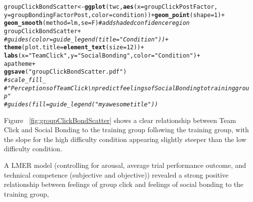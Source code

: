 \documentclass[english]{article}\usepackage[]{graphicx}\usepackage[]{color}
\makeatletter
\newcommand{\hlnum}[1]{\textcolor[rgb]{0.686,0.059,0.569}{#1}}%
\newcommand{\hlstr}[1]{\textcolor[rgb]{0.192,0.494,0.8}{#1}}%
\newcommand{\hlcom}[1]{\textcolor[rgb]{0.678,0.584,0.686}{\textit{#1}}}%
\newcommand{\hlopt}[1]{\textcolor[rgb]{0,0,0}{#1}}%
\newcommand{\hlstd}[1]{\textcolor[rgb]{0.345,0.345,0.345}{#1}}%
\newcommand{\hlkwb}[1]{\textcolor[rgb]{0.69,0.353,0.396}{#1}}%
\newcommand{\hlkwc}[1]{\textcolor[rgb]{0.333,0.667,0.333}{#1}}%
\newcommand{\hlkwd}[1]{\textcolor[rgb]{0.737,0.353,0.396}{\textbf{#1}}}%
\newenvironment{kframe}{%
 \def\at@end@of@kframe{}%
 \ifinner\ifhmode%
  \def\at@end@of@kframe{\end{minipage}}%
  \begin{minipage}{\columnwidth}%
 \fi\fi%
 \def\FrameCommand##1{\hskip\@totalleftmargin \hskip-\fboxsep
 \colorbox{shadecolor}{##1}\hskip-\fboxsep
     \hskip-\linewidth \hskip-\@totalleftmargin \hskip\columnwidth}%
 \MakeFramed {\advance\hsize-\width
   \@totalleftmargin\z@ \linewidth\hsize
   \@setminipage}}%
 {\par\unskip\endMakeFramed%
 \at@end@of@kframe}
\newenvironment{knitrout}{}{} %
\makeatother
\begin{document}
\begin{knitrout}
\color{fgcolor}\begin{kframe}
\begin{alltt}
  \hlstd{groupClickBondScatter} \hlkwb{<-} \hlkwd{ggplot}\hlstd{(twc,} \hlkwd{aes}\hlstd{(}\hlkwc{x}\hlstd{=groupClickPostFactor,}
                              \hlkwc{y}\hlstd{=groupBondingFactorPost,} \hlkwc{color}\hlstd{=condition))} \hlopt{+} \hlkwd{geom_point}\hlstd{(}\hlkwc{shape} \hlstd{=} \hlnum{1}\hlstd{)} \hlopt{+}
                             \hlkwd{geom_smooth}\hlstd{(}\hlkwc{method}\hlstd{=lm,} \hlkwc{se}\hlstd{=F)}   \hlcom{#  add shaded confidence region}
  \hlstd{groupClickBondScatter} \hlopt{+}
  \hlcom{#              guides(color = guide_legend(title="Condition"))+}
              \hlkwd{theme}\hlstd{(}\hlkwc{plot.title} \hlstd{=} \hlkwd{element_text}\hlstd{(}\hlkwc{size}\hlstd{=}\hlnum{12}\hlstd{))} \hlopt{+}
              \hlkwd{labs}\hlstd{(}\hlkwc{x} \hlstd{=} \hlstr{"Team Click"}\hlstd{,} \hlkwc{y} \hlstd{=} \hlstr{"Social Bonding"}\hlstd{,} \hlkwc{color} \hlstd{=} \hlstr{"Condition"}\hlstd{)}\hlopt{+}
              \hlstd{apatheme} \hlopt{+}
              \hlkwd{ggsave}\hlstd{(}\hlstr{"groupClickBondScatter.pdf"}\hlstd{)}
              \hlcom{#              scale_fill_}
              \hlcom{#"Perceptions of Team Click \textbackslash{}n predict feelings of Social Bonding to training group"}
              \hlcom{#guides(fill=guide_legend("my awesome title"))}
\end{alltt}
\end{kframe}
\end{knitrout}

Figure ~\ref{fig:groupClickBondScatter} shows a clear relationship between Team Click and Social Bonding to the training group following the training group, with the slope for the high difficulty condition appearing slightly steeper than the low difficulty condition.



A LMER model (controlling for arousal, average trial performance outcome, and technical competence (subjective and objective)) revealed a strong positive relationship between feelings of group click and feelings of social bonding to the training group,
\end{document}
